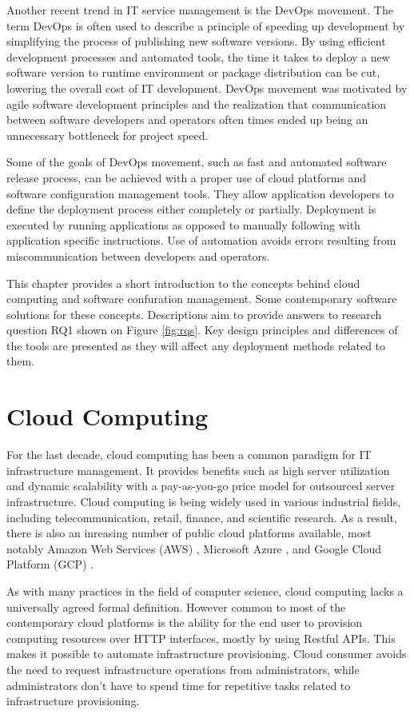 \documentclass[officiallayout]{tktla}
\begin{document}
Another recent trend in IT service management is the DevOps movement. The term
DevOps is often used to describe a principle of speeding up development by
simplifying the process of publishing new software versions. By using efficient
development processes and automated tools, the time it takes to
deploy a new software version to runtime environment or package distribution
can be cut, lowering the overall cost of IT development. DevOps movement was
motivated by agile software development principles and the realization that
communication between software developers and operators often times ended up
being an unnecessary bottleneck for project speed.

Some of the goals of DevOps movement, such as fast and automated software
release process, can be achieved with a proper use of cloud platforms and
software configuration management tools. They allow application developers to
define the deployment process either completely or partially. Deployment is
executed by running applications as opposed to manually following with
application specific instructions. Use of automation avoids errors resulting
from miscommunication between developers and operators.

This chapter provides a short introduction to the concepts behind cloud
computing and software confuration management. Some contemporary software
solutions for these concepts. Descriptions aim to provide answers to research
question RQ1 shown on Figure \ref{fig:rqs}. Key design principles and
differences of the tools are presented as they will affect any deployment
methods related to them.

\section{Cloud Computing}

For the last decade, cloud computing has been a common paradigm for IT
infrastructure management. It provides benefits such as high server utilization
and dynamic scalability with a pay-as-you-go price model for outsourced server
infrastructure. Cloud computing is being widely used in various industrial
fields, including telecommunication, retail, finance, and scientific research.
As a result, there is also an inreasing number of public cloud platforms
available, most notably Amazon Web Services (AWS) \cite{aws}, Microsoft Azure
\cite{azure}, and Google Cloud Platform (GCP) \cite{gcp}.

As with many practices in the field of computer science, cloud computing lacks
a universally agreed formal definition. However common to most of the
contemporary cloud platforms is the ability for the end user to provision
computing resources over HTTP interfaces, mostly by using Restful APIs. This
makes it possible to automate infrastructure provisioning. Cloud consumer
avoids the need to request infrastructure operations from administrators, while
administrators don't have to spend time for repetitive tasks related to
infrastructure provisioning.
\end{document}
